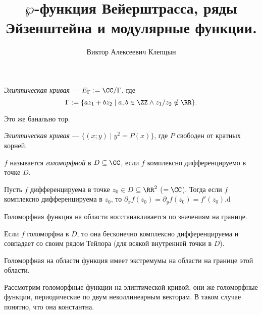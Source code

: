 \documentclass[12pt,a4paper]{article}
\title{$\wp$-функция Вейерштрасса, ряды Эйзенштейна и модулярные функции.}
\author{Виктор Алексеевич Клепцын}
\begin{document}
    \maketitle

    \begin{definition}
        \emph{Элиптическая кривая} --- $E_\Gamma := \CC / \Gamma$, где
        \[\Gamma := \{a z_1 + b z_2 \mid a, b \in \ZZ \wedge z_1/ z_2 \notin \RR\}.\]
    \end{definition}

    \begin{remark}
        Это же банально тор.
    \end{remark}

    \begin{definition}
        \emph{Элиптическая кривая} --- $\{(x; y) \mid y^2 = P(x)\}$, где $P$ свободен от кратных корней.
    \end{definition}

    \begin{definition}
        $f$ называется \emph{голоморфной} в $D \subseteq \CC$, если $f$ комплексно дифференцируемо в точке $D$.
    \end{definition}

    \begin{lemma}
        Пусть $f$ дифференцируема в точке $z_0 \in D \subseteq \RR^2$ ($= \CC$). Тогда если $f$ комплексно дифференцируема в $z_0$, то $\partial_x f(z_0) = \partial_y f(z_0) = f'(z_0)$.d
    \end{lemma}

    \begin{lemma}
        Голоморфная функция на области восстанавливается по значениям на границе.
    \end{lemma}

    \begin{lemma}
        Если $f$ голоморфна в $D$, то она бесконечно комплексно дифференцируема и совпадает со своим рядом Тейлора (для всякой внутренней точки в $D$).
    \end{lemma}

    \begin{lemma}
        Голоморфная на области функция имеет экстремумы на области на границе этой области.
    \end{lemma}
    
    \begin{remark}
        Рассмотрим голоморфные функции на элиптической кривой, они же голоморфные функции, периодические по двум неколлинеарным векторам. В таком случае понятно, что она константна.
    \end{remark}
\end{document}
